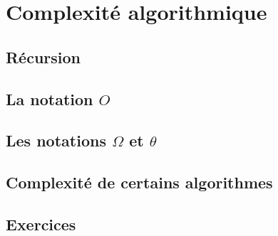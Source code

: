 \chapter{Complexité algorithmique}
\section{R\'ecursion}
\section{La notation $O$}
\section{Les notations $\Omega$ et $\theta$}
\section{Complexit\'e de certains algorithmes}
\section{Exercices}
